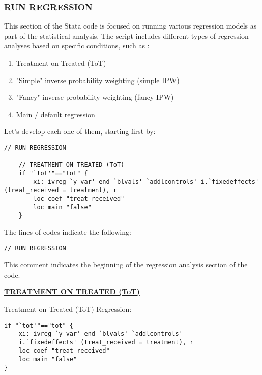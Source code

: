 \documentclass{article}
\begin{document}
\subsubsection{RUN REGRESSION}
\vspace{0.5cm}This section of the Stata code is focused on running various regression models as part of the statistical analysis. The script includes different types of regression analyses based on specific conditions, such as :
\begin{enumerate}
    \item Treatment on Treated (ToT)
    \item "Simple" inverse probability weighting (simple IPW)
    \item "Fancy" inverse probability weighting (fancy IPW)
    \item Main / default regression
\end{enumerate}

\vspace{0.5cm}Let’s develop each one of them, starting first by:
\begin{mdframed}
\begin{verbatim}
// RUN REGRESSION 

	// TREATMENT ON TREATED (ToT)
	if "`tot'"=="tot" { 
		xi: ivreg `y_var'_end `blvals' `addlcontrols' i.`fixedeffects' (treat_received = treatment), r
		loc coef "treat_received"
		loc main "false"
	}
\end{verbatim}
\end{mdframed}

\vspace{0.3cm} The lines of codes indicate the following: 
\begin{mdframed}
\begin{verbatim}
// RUN REGRESSION
\end{verbatim}
\end{mdframed}

\vspace{0.3cm}This comment indicates the beginning of the regression analysis section of the code.

\underline{\textbf{TREATMENT ON TREATED (ToT)}}\newline
    
\vspace{0.3cm}Treatment on Treated (ToT) Regression:

\begin{mdframed}
\begin{verbatim}
if "`tot'"=="tot" { 
    xi: ivreg `y_var'_end `blvals' `addlcontrols' 
    i.`fixedeffects' (treat_received = treatment), r
    loc coef "treat_received"
    loc main "false"
}
\end{verbatim}
\end{mdframed}
\end{document}
